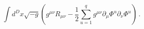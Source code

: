 \begin{equation}
\int d^D x \sqrt{-g}\left(g^{\mu\nu}R_{\mu\nu}-
\frac{1}{2}\sum_{u=1}^q  g^{\mu\nu}\partial_\mu\Phi^u\partial_\nu\Phi^u\right)\, .
\end{equation} 
